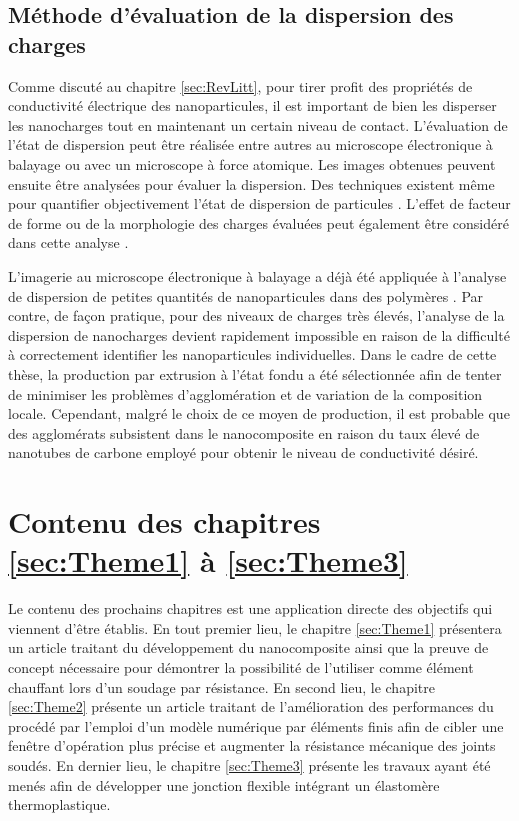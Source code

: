 \subsection{Méthode d'évaluation de la dispersion des charges}

Comme discuté au chapitre \ref{sec:RevLitt}, pour tirer profit des propriétés de conductivité électrique des nanoparticules, il est important de bien les disperser les nanocharges tout en maintenant un certain niveau de contact. 
L'évaluation de l'état de dispersion peut être réalisée entre autres au microscope électronique à balayage ou avec un microscope à force atomique. 
Les images obtenues peuvent ensuite être analysées pour évaluer la dispersion. 
Des techniques existent même pour quantifier objectivement l'état de dispersion de particules \cite{Bray2011,Bray2012}. 
L'effet de facteur de forme ou de la morphologie des charges évaluées peut également être considéré dans cette analyse \cite{Bray2013a,Sul2011}. 

L'imagerie au microscope électronique à balayage a déjà été appliquée à l'analyse de dispersion de petites quantités de nanoparticules dans des polymères \cite{Xie2005,Diez-Pascual2009,Xin2011,Grossiord2008a,Bauhofer2009,Abbas2016}. 
Par contre, de façon pratique, pour des niveaux de charges très élevés, l'analyse de la dispersion de nanocharges devient rapidement impossible en raison de la difficulté à correctement identifier les nanoparticules individuelles. 
Dans le cadre de cette thèse, la production par extrusion à l'état fondu a été sélectionnée afin de tenter de minimiser les problèmes d'agglomération et de variation de la composition locale. 
Cependant, malgré le choix de ce moyen de production, il est probable que des agglomérats subsistent dans le nanocomposite en raison du taux élevé de nanotubes de carbone employé pour obtenir le niveau de conductivité désiré. 

\section{Contenu des chapitres \ref{sec:Theme1} à \ref{sec:Theme3}}

Le contenu des prochains chapitres est une application directe des objectifs qui viennent d'être établis. 
En tout premier lieu, le chapitre \ref{sec:Theme1} présentera un article traitant du développement du nanocomposite ainsi que la preuve de concept nécessaire pour démontrer la possibilité de l'utiliser comme élément chauffant lors d'un soudage par résistance. 
En second lieu, le chapitre \ref{sec:Theme2} présente un article traitant de l'amélioration des performances du procédé par l'emploi d'un modèle numérique par éléments finis afin de cibler une fenêtre d'opération plus précise et augmenter la résistance mécanique des joints soudés. 
En dernier lieu, le chapitre \ref{sec:Theme3} présente les travaux ayant été menés afin de développer une jonction flexible intégrant un élastomère thermoplastique. 
